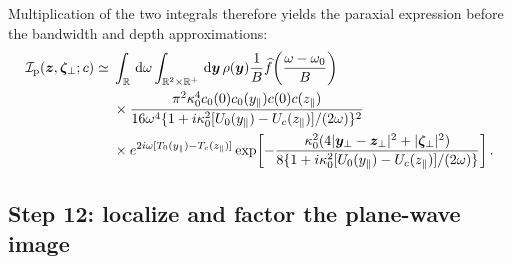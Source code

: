 \documentclass[11pt]{article}
\newcommand{\R}{\mathbb{R}}
\newcommand{\by}{\bm{y}}
\newcommand{\bz}{\bm{z}}
\newcommand{\bzeta}{\boldsymbol{\zeta}}
\newcommand{\dd}{\,\mathrm{d}}
\begin{document}
Multiplication of the two integrals therefore yields the paraxial
expression before the bandwidth and depth approximations:
\begin{align}
\mathcal I_{\rm p}(\bz,\bzeta_\perp;c)
\simeq{}&\int_\R\dd\omega\int_{\R^2\times\R^+}\dd\by\,
\rho(\by)\frac{1}{B}\widehat f\!\left(\frac{\omega-\omega_0}{B}\right)
\nonumber\\
&\times\frac{\pi^2\kappa_0^4c_0(0)c_0(y_\parallel)c(0)c(z_\parallel)}
{16\omega^4
\{1+i\kappa_0^2[U_0(y_\parallel)-U_c(z_\parallel)]/(2\omega)\}^2}
\nonumber\\
&\times e^{2i\omega[T_0(y_\parallel)-T_c(z_\parallel)]}
\exp\!\left[-\frac{\kappa_0^2
(4|\by_\perp-\bz_\perp|^2+|\bzeta_\perp|^2)}
{8\{1+i\kappa_0^2[U_0(y_\parallel)-U_c(z_\parallel)]/(2\omega)\}}\right].
\label{eq:Ip-before-localization}
\end{align}

\subsection{Step 12: localize and factor the plane-wave image}
\end{document}
